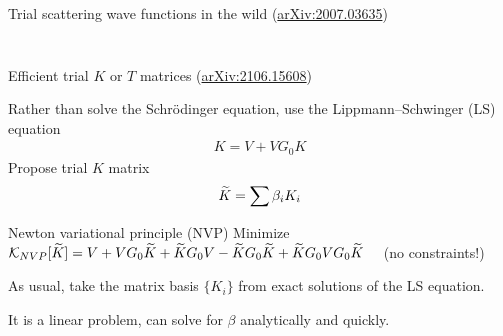 \documentclass[xcolor=dvipsnames, aspectratio=169]{beamer}
\begin{document}
\begin{frame}{Trial scattering wave functions in the wild (\alert{\href{https://arxiv.org/abs/2007.03635}{arXiv:2007.03635}})}

\begin{columns}
\begin{column}{0.5\textwidth}
\end{column}
\begin{column}{0.5\textwidth}

\begin{figure}
\end{figure}
\end{column}
\end{columns}
\end{frame}


\begin{frame}{Efficient trial $K$ or $T$ matrices (\alert{\href{https://arxiv.org/abs/2106.15608}{arXiv:2106.15608}})}

Rather than solve the Schr{\"o}dinger equation, use the Lippmann--Schwinger (LS) equation
\begin{align*}
    K = V + V G_0 K
\end{align*}
Propose \alert{trial $K$ matrix}
\begin{align*}
    \widetilde{K} = \sum \beta_i K_i
\end{align*}

\begin{myblock}[valign=center]{Newton variational principle (NVP)}
Minimize $\mathcal{K}_{NVP}[\widetilde{K}] = V + V G_0 \widetilde{K} + \widetilde{K} G_0 V - \widetilde{K} G_0 \widetilde{K} + \widetilde{K} G_0 V G_0 \widetilde{K}$ ~~(no constraints!)
\end{myblock}%

As usual, take the \alert{matrix basis} $\{K_i\}$ from exact solutions of the LS equation.

It is a linear problem, can solve for $\beta$ analytically and quickly.

\end{frame}
\end{document}

